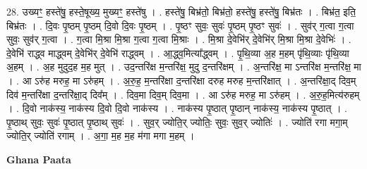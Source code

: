 \documentclass[17pt]{extarticle}
\begin{document}
28. उख्यꣳ॒॒ हस्ते॑षु॒ हस्ते॒षूख्य॒ मुख्यꣳ॒॒ हस्ते॑षु । . हस्ते॑षु॒ बिभ्र॑तो॒ बिभ्र॑तो॒ हस्ते॑षु॒ हस्ते॑षु॒ बिभ्र॑तः । . बिभ्र॑त॒ इति॒ बिभ्र॑तः । . दि॒वः पृ॒ष्ठम् पृ॒ष्ठम् दि॒वो दि॒वः पृ॒ष्ठम् । . पृ॒ष्ठꣳ सुवः॒ सुवः॑ पृ॒ष्ठम् पृ॒ष्ठꣳ सुवः॑ । . सुव॑र् ग॒त्वा ग॒त्वा सुवः॒ सुव॑र् ग॒त्वा । . ग॒त्वा मि॒श्रा मि॒श्रा ग॒त्वा ग॒त्वा मि॒श्राः । . मि॒श्रा दे॒वेभि॑र् दे॒वेभि॑र् मि॒श्रा मि॒श्रा दे॒वेभिः॑ । . दे॒वेभि॑ राद्ध्व माद्ध्वम् दे॒वेभि॑र् दे॒वेभि॑ राद्ध्वम् । . आ॒द्ध्व॒मित्या᳚द्ध्वम् । . पृ॒थि॒व्या अ॒ह म॒हम् पृ॑थि॒व्याः पृ॑थि॒व्या अ॒हम् । . अ॒ह मुदुद॒ह म॒ह मुत् । . उद॒न्तरि॑क्ष म॒न्तरि॑क्ष॒ मुदु द॒न्तरि॑क्षम् । . अ॒न्तरि॑क्ष॒ मा ऽन्तरि॑क्ष म॒न्तरि॑क्ष॒ मा । . आ ऽरु॑ह मरुह॒ मा ऽरु॑हम् । . अ॒रु॒ह॒ म॒न्तरि॑क्षा द॒न्तरि॑क्षा दरुह मरुह म॒न्तरि॑क्षात् । . अ॒न्तरि॑क्षा॒द् दिव॒म् दिव॑ म॒न्तरि॑क्षा द॒न्तरि॑क्षा॒द् दिव᳚म् । . दिव॒मा दिव॒म् दिव॒मा । . आ ऽरु॑ह मरुह॒ मा ऽरु॑हम् । . अ॒रु॒ह॒मित्य॑रुहम् । . दि॒वो नाक॑स्य॒ नाक॑स्य दि॒वो दि॒वो नाक॑स्य । . नाक॑स्य पृ॒ष्ठात् पृ॒ष्ठान् नाक॑स्य॒ नाक॑स्य पृ॒ष्ठात् । . पृ॒ष्ठाथ् सुवः॒ सुवः॑ पृ॒ष्ठात् पृ॒ष्ठाथ् सुवः॑ । . सुव॒र् ज्योति॒र् ज्योतिः॒ सुवः॒ सुव॒र् ज्योतिः॑ । . ज्योति॑ रगा मगा॒म् ज्योति॒र् ज्योति॑ रगाम् । . अ॒गा॒ म॒ह म॒ह म॑गा मगा म॒हम् । \newline

\textbf{Ghana Paata } \newline
\end{document}
